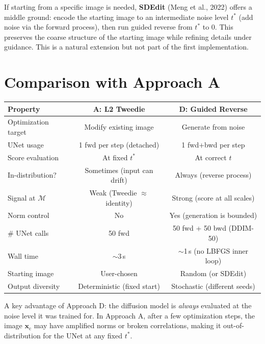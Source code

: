 \documentclass[11pt]{article}
\newcommand{\xb}{\mathbf{x}}
\newcommand{\xc}{\xb_{\mathrm{c}}}
\begin{document}
If starting from a specific image is needed, \textbf{SDEdit} (Meng et al., 2022)
offers a middle ground: encode the starting image to an intermediate noise level $t^*$
(add noise via the forward process), then run guided reverse from $t^*$ to 0.
This preserves the coarse structure of the starting image while refining details
under guidance. This is a natural extension but not part of the first implementation.

\section{Comparison with Approach A}
\label{sec:comparison}

\begin{center}
\begin{tabular}{lcc}
\toprule
\textbf{Property} & \textbf{A: L2 Tweedie} & \textbf{D: Guided Reverse} \\
\midrule
Optimization target & Modify existing image & Generate from noise \\
UNet usage & 1 fwd per step (detached) & 1 fwd+bwd per step \\
Score evaluation & At fixed $t^*$ & At correct $t$ \\
In-distribution? & Sometimes (input can drift) & Always (reverse process) \\
Signal at $\mathcal{M}$ & Weak (Tweedie $\approx$ identity) & Strong (score at all scales) \\
Norm control & No & Yes (generation is bounded) \\
\# UNet calls & 50 fwd & 50 fwd + 50 bwd (DDIM-50) \\
Wall time & $\sim$3\,s & $\sim$1\,s (no LBFGS inner loop) \\
Starting image & User-chosen & Random (or SDEdit) \\
Output diversity & Deterministic (fixed start) & Stochastic (different seeds) \\
\bottomrule
\end{tabular}
\end{center}

A key advantage of Approach D: the diffusion model is \emph{always} evaluated
at the noise level it was trained for. In Approach A, after a few optimization steps,
the image $\xc$ may have amplified norms or broken correlations, making it
out-of-distribution for the UNet at any fixed $t^*$.
\end{document}
